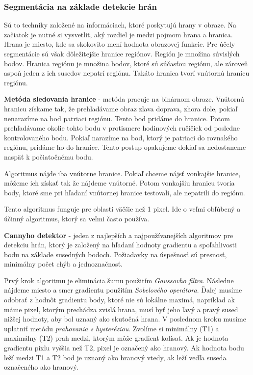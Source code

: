 \subsubsection{Segmentácia na základe detekcie hrán}
Sú to techniky založené na informáciach, ktoré poskytujú hrany v obraze. Na začiatok je nutné si vysvetliť, aký rozdiel je medzi pojmom hrana a hranica. Hrana je miesto, kde sa skokovito mení hodnota obrazovej funkcie. Pre účely segmentácie sú však dôležitejšie hranice regiónov. Región je množina súvislých bodov. Hranica regiónu je množina bodov, ktoré sú súčasťou regiónu, ale zároveň aspoň jeden z ich susedov nepatrí regiónu. Takáto hranica tvorí vnútornú hranicu regiónu. \cite{pocitacove_videnie_v_praxi} 

\textbf{Metóda sledovania hranice}
\label{sec:follow_border} - metóda pracuje na binárnom obraze. Vnútornú hranicu získame tak, že prehľadávame obraz zľava doprava, zhora dole, pokiaľ nenarazíme na bod patriaci regiónu. Tento bod pridáme do hranice. Potom prehľadávame okolie tohto bodu v protismere hodinových ručičiek od posledne kontrolovaného bodu. Pokiaľ narazíme na bod, ktorý je patriaci do rovnakého regiónu, pridáme ho do hranice. Tento postup opakujeme dokiaľ sa nedostaneme naspäť k počiatočnému bodu. \cite{pocitacove_videnie_v_praxi} 

Algoritmus nájde iba vnútorne hranice. Pokiaľ chceme nájsť vonkajšie hranice, môžeme ich získať tak že nájdeme vnútorné. Potom vonkajšiu hranicu tvoria body, ktoré sme pri hľadaní vnútornej hranice testovali, ale nepatrili do regiónu. 

Tento algoritmus funguje pre oblasti väčšie než 1 pixel. Ide o veľmi obľúbený a účinný algoritmus, ktorý sa veľmi často používa.

\textbf{Cannyho detektor} \cite{cannyho_detektor} - jeden z najlepších a najpoužívanejších algoritmov pre detekciu hrán, ktorý je založený na hľadaní hodnoty gradientu a spoľahlivosti bodu na základe susedných bodoch. Požiadavky na úspešnosť sú presnosť, minimálny počet chýb a jednoznačnosť. 

Prvý krok algoritmu je eliminácia šumu použitím \textit{Gaussovho filtra}. Následne nájdeme miesto a smer gradientu použitím \textit{Sobelového operátora}. Ďalej musíme odobrať z hodnôt gradientu  body, ktoré nie sú lokálne maximá, napríklad ak máme pixel, ktorým prechádza zvislá hrana, musí byť jeho ľavý a pravý sused nižšej hodnoty, aby bol uznaný  ako skutočná hrana. V poslednom kroku musíme uplatniť metódu \textit{prahovania s hysteréziou}. Zvolíme si minimálny (T1) a maximálny (T2) prah medzi, ktorým môže gradient kolísať. Ak je hodnota gradientu pixlu vyššia než T2, pixel je označený ako hranový. Ak hodnota bodu leží medzi T1 a T2 bod je uznaný ako hranový vtedy, ak leží vedľa suseda označeného ako hranový. \cite{cannyho_detektor}



